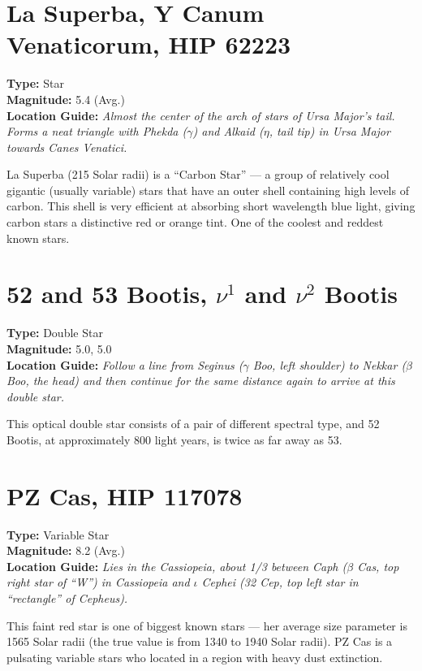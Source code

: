 \section{La Superba, Y Canum Venaticorum, HIP 62223}
\textbf{Type:} Star \\
\textbf{Magnitude:} 5.4 (Avg.) \\
\textbf{Location Guide:} \textit{Almost the center of the arch of stars of Ursa Major's tail. Forms a neat triangle with Phekda ($\gamma$) and Alkaid ($\eta$, tail tip) in Ursa Major towards Canes Venatici.} 

La Superba (215 Solar radii) is a ``Carbon Star'' --- a group of relatively cool gigantic (usually variable) stars that have an outer shell containing high levels of carbon. This shell is very efficient at absorbing short wavelength blue light, giving carbon stars a distinctive red or orange tint. One of the coolest and reddest known stars.

\section{52 and 53 Bootis, \texorpdfstring{$\nu^1$ and $\nu^2$}{nu1 and nu2} Bootis} 
\textbf{Type:} Double Star \\
\textbf{Magnitude:} 5.0, 5.0 \\
\textbf{Location Guide:} \textit{Follow a line from Seginus ($\gamma$ Boo, left shoulder) to Nekkar ($\beta$ Boo, the head) and then continue for the same distance again to arrive at this double star.} 

This optical double star consists of a pair of different spectral type, and 52 Bootis, at approximately 800 light years, is twice as far away as 53.

\section{PZ Cas, HIP 117078}
\textbf{Type:} Variable Star \\
\textbf{Magnitude:} 8.2 (Avg.) \\
\textbf{Location Guide:} \textit{Lies in the Cassiopeia, about 1/3 between Caph ($\beta$ Cas, top right star of ``W'') in Cassiopeia and $\iota$ Cephei (32 Cep, top left star in ``rectangle'' of Cepheus).}

This faint red star is one of biggest known stars --- her average size parameter is 1565 Solar radii (the true value is from 1340 to 1940 Solar radii). PZ Cas is a pulsating variable stars who located in a region with heavy dust extinction.

